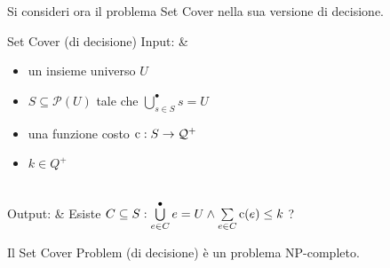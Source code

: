 Si consideri ora il problema Set Cover nella sua versione di decisione.\\
\begin{problem}[lined]{Set Cover (di decisione)}
    Input: & \begin{minipage}[t]{0.8\linewidth}\begin{itemize}
        \setlength\itemsep{0em}
        \item un insieme universo $U$
        \item $S \subseteq \mathcal{P}(U)$ tale che $\bigcup\limits_{s \in S}^{\bullet} s = U$
        \item una funzione costo $\textnormal{c}: S \rightarrow \mathcal{Q}^+$
        \item $k \in Q^+$
    \end{itemize}\end{minipage}\\
    Output: & Esiste $C \subseteq S : \bigcup\limits_{e \in C}^{\bullet} e = U \land \sum\limits_{e \in C} \textnormal{c}(e) \le k$ ?
\end{problem}
\begin{thm}
    Il Set Cover Problem (di decisione) è un problema NP-completo.
\end{thm}
